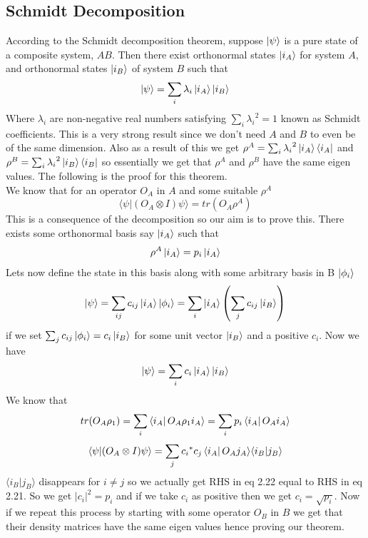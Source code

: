 \documentclass{report}
\begin{document}
\subsection{Schmidt Decomposition}
According to the Schmidt decomposition theorem, suppose $\ket{\psi}$ is a pure state of a composite system, $AB$. Then there exist orthonormal states $\ket{i_A}$ for system $A$, and orthonormal states $\ket{i_B}$ of system $B$ such that
$$\ket{\psi} = \sum_{i}\lambda_{i}\ket{i_A}\ket{i_B}$$
Where $\lambda_i$ are non-negative real numbers satisfying $\sum_{i}{\lambda_i}^2 = 1$ known as Schmidt coefficients. This is a very strong result since we don't need $A$ and $B$ to even be of the same dimension. Also as a result of this we get $\rho^{A} = \sum_{i}{\lambda_{i}}^2\ket{i_A}\bra{i_A}$ and $\rho^{B} = \sum_{i}{\lambda_{i}}^2\ket{i_B}\bra{i_B}$ so essentially we get that $\rho^{A}$ and $\rho^{B}$ have the same eigen values. The following is the proof for this theorem.\\
We know that for an operator $O_A$ in $A$ and some suitable $\rho^A$
\begin{equation}\langle\psi|(O_A \otimes I)\psi\rangle = tr({O_{A}}\rho^A)
\end{equation}
This is a consequence of the decomposition so our aim is to prove this.
There exists some orthonormal basis say $\ket{i_A}$ such that
\begin{equation}\rho^{A}\ket{i_A} = p_{i}\ket{i_A}\end{equation}
Lets now define the state in this basis along with some arbitrary basis in B $\ket{\phi_{i}}$
\begin{equation}\ket{\psi} = \sum_{ij}c_{ij}\ket{i_A}\ket{\phi_{i}} = \sum_{i}\ket{i_A}\left(\sum_{j}c_{ij}\ket{i_B}\right)\end{equation}
if we set $\sum_{j}c_{ij}\ket{\phi_{i}} = c_{i}\ket{i_B}$ for some unit vector $\ket{i_B}$ and a positive $c_i$. Now we have
\begin{equation}\ket{\psi} = \sum_{i}c_{i}\ket{i_A}\ket{i_B}\end{equation}
We know that
\begin{equation}tr({O_{A}}\rho_1) = \sum_{i}\bra{i_A}{O_{A}}\rho_{1}i_{A}\rangle = \sum_{i}p_{i}\bra{i_A}{O_{A}}i_{A}\rangle\end{equation}
\begin{equation}\langle\psi|(O_A \otimes I)\psi\rangle = \sum_{j}{c_i}^{*}{c_j}\bra{i_A}O_{A}j_{A}\rangle\langle{i_B}|{j_B}\rangle\end{equation}
$\langle{i_B}|{j_B}\rangle$ disappears for $i \neq j$ so we actually get RHS in eq 2.22 equal to RHS in eq 2.21. So we get $|c_i|^2 = p_i$ and if we take $c_i$ as positive then we get $c_i = \sqrt{p_i}$. Now if we repeat this process by starting with some operator $O_B$ in $B$ we get that their density matrices have the same eigen values hence proving our theorem.
\end{document}
